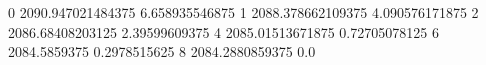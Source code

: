 0 2090.947021484375 6.658935546875
1 2088.378662109375 4.090576171875
2 2086.68408203125 2.39599609375
4 2085.01513671875 0.72705078125
6 2084.5859375 0.2978515625
8 2084.2880859375 0.0
